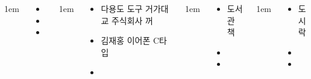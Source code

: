 \documentclass[25pt, a0paper ]{tikzposter}
\begin{document}
\begin{columns}
			{
					\setlength{\leftmargini}{4em}
					\setlength{\labelsep} {1em}
				\begin{LARGE}
					\begin{itemize}
					\item 
					\item 
					\item 
					\end{itemize}
				\end{LARGE}
			}




			{
					\setlength{\leftmargini}{4em}
					\setlength{\labelsep} {1em}
				\begin{LARGE}
					\begin{itemize}
					\item 다용도 도구 거가대교 주식회사 꺼
					\item 김재홍 이어폰 C타입
					\item 
					\end{itemize}
				\end{LARGE}
			}



			{
					\setlength{\leftmargini}{4em}
					\setlength{\labelsep} {1em}
				\begin{LARGE}
					\begin{itemize}
					\item 도서관 책
					\item 
					\item 
					\end{itemize}
				\end{LARGE}
			}



			{
					\setlength{\leftmargini}{4em}
					\setlength{\labelsep} {1em}
				\begin{LARGE}
					\begin{itemize}
					\item 도시락
					\item 
					\item 
					\end{itemize}
				\end{LARGE}
			}



\end{columns}
\end{document}
